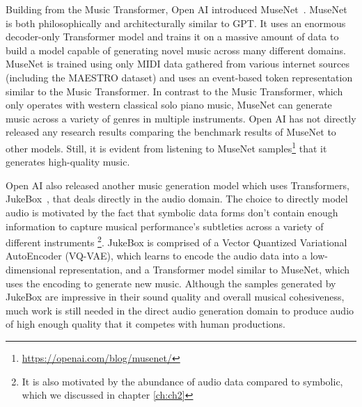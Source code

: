 Building from the Music Transformer, Open AI introduced MuseNet~\cite{payne_2020}. MuseNet is both philosophically and architecturally similar to GPT. It uses an enormous decoder-only Transformer model and trains it on a massive amount of data to build a model capable of generating novel music across many different domains. MuseNet is trained using only MIDI data gathered from various internet sources (including the MAESTRO dataset) and uses an event-based token representation similar to the Music Transformer. In contrast to the Music Transformer, which only operates with western classical solo piano music, MuseNet can generate music across a variety of genres in multiple instruments. Open AI has not directly released any research results comparing the benchmark results of MuseNet to other models. Still, it is evident from listening to MuseNet samples\footnote{\url{https://openai.com/blog/musenet/}} that it generates high-quality music. 

Open AI also released another music generation model which uses Transformers, JukeBox~\cite{dhariwal2020jukebox}, that deals directly in the audio domain. The choice to directly model audio is motivated by the fact that symbolic data forms don't contain enough information to capture musical performance's subtleties across a variety of different instruments%
\footnote{It is also motivated by the abundance of audio data compared to symbolic, which we discussed in chapter \ref{ch:ch2}}. JukeBox is comprised of a Vector Quantized Variational AutoEncoder (VQ-VAE), which learns to encode the audio data into a low-dimensional representation, and a Transformer model similar to MuseNet, which uses the encoding to generate new music. Although the samples generated by JukeBox are impressive in their sound quality and overall musical cohesiveness, much work is still needed in the direct audio generation domain to produce audio of high enough quality that it competes with human productions. 



